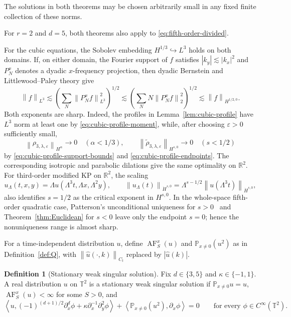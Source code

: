 \documentclass[12pt,reqno,letterpaper]{amsart}
\numberwithin{equation}{section}
\theoremstyle{definition}
\newtheorem{definition}[theorem]{Definition}
\newcommand{\T}{\mathbb T}
\newcommand{\R}{\mathbb R}
\newcommand{\eps}{\varepsilon}
\newcommand{\la}{\lambda}
\newcommand{\ip}[2]{\left\langle #1,#2\right\rangle}
\newcommand{\norm}[1]{\left\lVert #1\right\rVert}
\newcommand{\abs}[1]{\left\lvert #1\right\rvert}
\begin{document}
The solutions in both theorems may be chosen arbitrarily small in any
fixed finite collection of these norms.

For $r=2$ and $d=5$, both theorems also apply to
\eqref{eq:fifth-order-divided}.

For the cubic equations, the Sobolev embedding
$H^{1/3}\hookrightarrow L^3$ holds on both domains.
If, on either domain, the Fourier support of $f$ satisfies
$\abs{k_y}\lesssim\abs{k_x}^2$ and $P_N^x$ denotes a dyadic
$x$-frequency projection, then dyadic Bernstein and Littlewood--Paley
theory give
\begin{equation}\label{eq:parabolic-product-endpoint}
 \norm f_{L^3}\lesssim
 \left(\sum_N\norm{P_N^xf}_{L^3}^2\right)^{1/2}
 \lesssim
 \left(\sum_N N\norm{P_N^xf}_2^2\right)^{1/2}
 \lesssim\norm f_{H^{1/2,0}}.
\end{equation}
Both exponents are sharp.  Indeed, the profiles in
Lemma~\ref{lem:cubic-profile} have $L^3$ norm at least one by
\eqref{eq:cubic-profile-moment}, while, after choosing $\eps>0$
sufficiently small,
\[
 \norm{\rho_{3,\la,\eps}}_{H^\alpha}\longrightarrow0
 \quad(\alpha<1/3),
 \qquad
 \norm{\widetilde\rho_{3,\la,\eps}}_{H^{s,0}}\longrightarrow0
 \quad(s<1/2)
\]
by \eqref{eq:cubic-profile-support-bounds} and
\eqref{eq:cubic-profile-endpoints}.
The corresponding isotropic and parabolic dilations give the same
optimality on $\R^2$.
For third-order modified KP
on $\R^2$, the scaling
\[
 u_\Lambda(t,x,y)=\Lambda u(\Lambda^3t,\Lambda x,\Lambda^2y),
 \qquad
 \norm{u_\Lambda(t)}_{\dot H^{s,0}}
 =\Lambda^{s-1/2}\norm{u(\Lambda^3t)}_{\dot H^{s,0}},
\]
also identifies $s=1/2$ as the critical exponent in $H^{s,0}$.  In the
whole-space fifth-order quadratic case,
Patterson's unconditional uniqueness for $s>0$~\cite{Patterson5KP} and
Theorem~\ref{thm:Euclidean} for $s<0$ leave only the endpoint $s=0$;
hence the nonuniqueness range is almost sharp.

For a time-independent distribution $u$, define
$\operatorname{AF}_S^x(u)$ and $\mathbb P_{x\neq0}(u^2)$ as in
Definition~\ref{def:Q}, with
$\norm{\widehat u(\cdot,k)}_{C_t}$ replaced by $\abs{\widehat u(k)}$.

\begin{definition}[Stationary weak singular solution]
\label{def:stationary-solution}
Fix $d\in\{3,5\}$ and $\kappa\in\{-1,1\}$.  A real distribution $u$ on
$\T^2$ is a stationary weak singular solution if
$\mathbb P_{x\neq0}u=u$, $\operatorname{AF}_S^x(u)<\infty$ for some
$S>0$, and
\begin{equation}\label{eq:stationary-weak}
 \ip{u}{(-1)^{(d+1)/2}\partial_x^d\phi
      +\kappa\partial_x^{-1}\partial_y^2\phi}
 +\ip{\mathbb P_{x\neq0}(u^2)}{\partial_x\phi}=0
 \qquad\text{for every }\phi\in C^\infty(\T^2).
\end{equation}
\end{definition}
\end{document}

